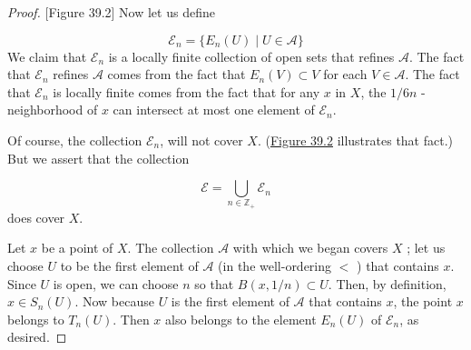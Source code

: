 \begin{proof}
[Figure 39.2]
Now let us define

\[
\mathcal{E}_{n} = \{ {E_{n}(U) \mid U \in \mathcal{A}}\}
\]
We claim that \(\mathcal{E}_{n}\) is a locally finite collection of open sets that refines \(\mathcal{A}\). The fact that \(\mathcal{E}_{n}\) refines \(\mathcal{A}\) comes from the fact that \(E_{n}(V) \subset V\) for each \(V \in \mathcal{A}\). The fact that \(\mathcal{E}_{n}\) is locally finite comes from the fact that for any \(x\) in \(X\), the \(1/{6n}\) -neighborhood of \(x\) can intersect at most one element of \(\mathcal{E}_{n}\).

Of course, the collection \(\mathcal{E}_{n}\), will not cover \(X\). (\hyperref[fig:39.2]{Figure 39.2} illustrates that fact.) But we assert that the collection

\[
\mathcal{E} = \mathop{\bigcup }\limits_{{n \in {\mathbb{Z}}_{ + }}}\mathcal{E}_{n}
\]
does cover \(X\).

Let \(x\) be a point of \(X\). The collection \(\mathcal{A}\) with which we began covers \(X\) ; let us choose \(U\) to be the first element of \(\mathcal{A}\) (in the well-ordering \(<\) ) that contains \(x\). Since \(U\) is open, we can choose \(n\) so that \(B({x,1/n}) \subset U\). Then, by definition, \(x \in {S}_{n}(U)\). Now because \(U\) is the first element of \(\mathcal{A}\) that contains \(x\), the point \(x\) belongs to \(T_{n}(U)\). Then \(x\) also belongs to the element \(E_{n}(U)\) of \(\mathcal{E}_{n}\), as desired.
\end{proof}

